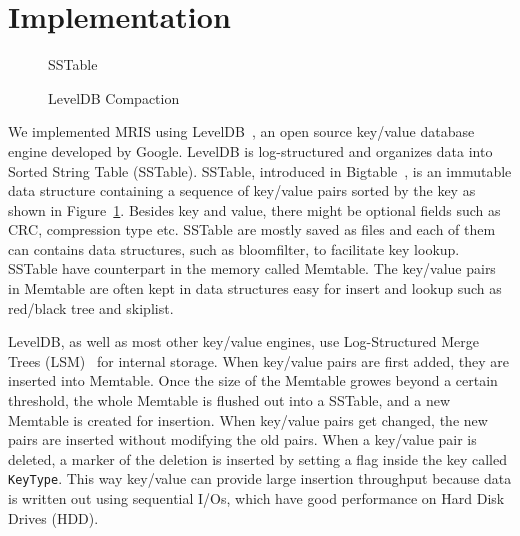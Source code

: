 \section{Implementation}
\label{sec:implementation}

\begin{figure}[t]
\begin{centering}
\caption{SSTable}
\label{fig:sstable}
\end{centering}
\end{figure}

\begin{figure}[t]
\begin{centering}
\caption{LevelDB Compaction}
\label{fig:compact}
\end{centering}
\end{figure}

We implemented MRIS using LevelDB~\cite{leveldb-web}, an open source
key/value database engine developed by Google. LevelDB is
log-structured and organizes data into Sorted String Table (SSTable).
SSTable, introduced in Bigtable~\cite{chang06osdi}, is an immutable
data structure containing a sequence of key/value pairs sorted by the
key as shown in Figure~\ref{fig:sstable}. Besides key and value, there
might be optional fields such as CRC, compression type etc. SSTable
are mostly saved as files and each of them can contains data
structures, such as bloomfilter, to facilitate key lookup. SSTable
have counterpart in the memory called Memtable. The key/value pairs in
Memtable are often kept in data structures easy for insert and lookup
such as red/black tree and skiplist.

LevelDB, as well as most other key/value engines, use Log-Structured
Merge Trees (LSM)~\cite{lsm} for internal storage. When key/value
pairs are first added, they are inserted into Memtable.  Once the size
of the Memtable growes beyond a certain threshold, the whole Memtable
is flushed out into a SSTable, and a new Memtable is created for
insertion. When key/value pairs get changed, the new pairs are
inserted without modifying the old pairs. When a key/value pair is
deleted, a marker of the deletion is inserted by setting a flag inside
the key called \texttt{KeyType}. This way key/value can provide large
insertion throughput because data is written out using sequential
I/Os, which have good performance on Hard Disk Drives (HDD). 

